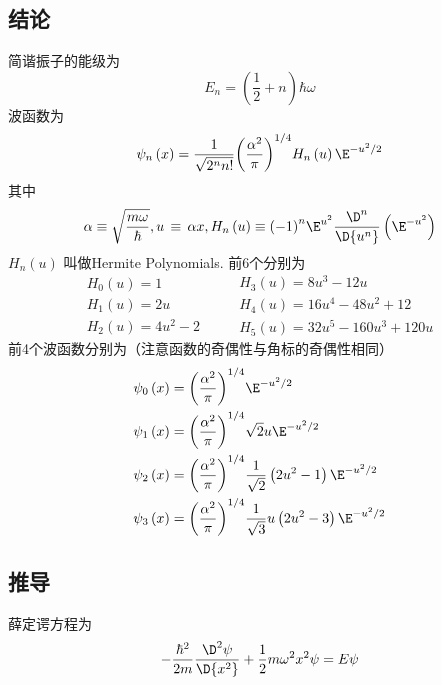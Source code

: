 
\subsection{结论}

简谐振子的能级为
\begin{equation}
{E_n} = \left( {\frac{1}{2} + n} \right)\hbar \omega 
\end{equation}
波函数为
\begin{equation}
{\psi _n}\left( x \right) = \frac{1}{{\sqrt {{2^n}n!} }}{\left( {\frac{{{\alpha ^2}}}{\pi }} \right)^{1/4}}{H_n}\left( u \right){\E^{ - {u^2}/2}}
\end{equation}
其中
\begin{equation}
\alpha  \equiv \sqrt {\frac{{m\omega }}{\hbar }} , u\, \equiv \,\alpha x, {H_n}\left( u \right) \equiv {\left( { - 1} \right)^n}{\E^{{u^2}}}\frac{{{\D^n}}}{{\D{u^n}}}\left( {{\E^{ - {u^2}}}} \right)
\end{equation}
${H_n}\left( u \right)$ 叫做Hermite Polynomials. 前6个分别为
\begin{equation}
\begin{array}{l}
{H_0}\left( u \right) = 1\\
{H_1}\left( u \right) = 2u\\
{H_2}\left( u \right) = 4{u^2} - 2
\end{array}
\qquad
\begin{array}{l}
{H_3}\left( u \right) = 8{u^3} - 12u\\
{H_4}\left( u \right) = 16{u^4} - 48{u^2} + 12\\
{H_5}\left( u \right) = 32{u^5} - 160{u^3} + 120u
\end{array}
\end{equation}
前4个波函数分别为（注意函数的奇偶性与角标的奇偶性相同）
\begin{equation}\begin{aligned}
{\psi _0}\left( x \right) &= {\left( {\frac{{{\alpha ^2}}}{\pi }} \right)^{1/4}}{\E^{ - {u^2}/2}}\\
{\psi _1}\left( x \right) &= {\left( {\frac{{{\alpha ^2}}}{\pi }} \right)^{1/4}}\sqrt 2 u{\E^{ - {u^2}/2}} \\
{\psi _2}\left( x \right) &= {\left( {\frac{{{\alpha ^2}}}{\pi }} \right)^{1/4}}\frac{1}{{\sqrt 2 }}\left( {2{u^2} - 1} \right){\E^{ - {u^2}/2}}\\
{\psi _3}\left( x \right) &= {\left( {\frac{{{\alpha ^2}}}{\pi }} \right)^{1/4}}\frac{1}{{\sqrt 3 }}u\left( {2{u^2} - 3} \right){\E^{ - {u^2}/2}}
\end{aligned}\end{equation}
\subsection{推导}%

薛定谔方程为
\begin{equation}
- \frac{{{\hbar ^2}}}{{2m}}\frac{{{\D^2}\psi }}{{\D{x^2}}} + \frac{1}{2}m{\omega ^2}{x^2}\psi  = E\psi
\end{equation}